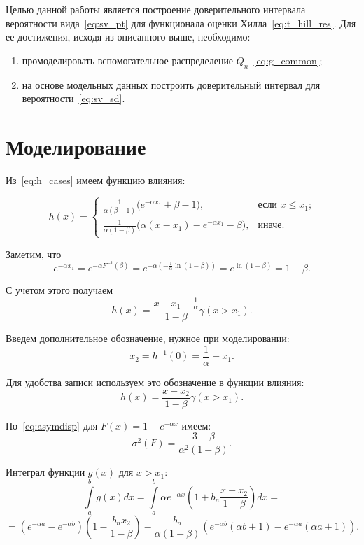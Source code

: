 \documentclass[12pt, specialist, subf, substylefile = spbu.rtx]{disser}
\begin{document}
Целью данной работы является построение доверительного интервала вероятности вида~\eqref{eq:sv_pt} для функционала оценки Хилла~\eqref{eq:t_hill_res}. Для ее достижения, исходя из описанного выше, необходимо:

\begin{enumerate}
\item промоделировать вспомогательное распределение $Q_n$~\eqref{eq:g_common};

\item на основе модельных данных построить доверительный интервал для вероятности~\eqref{eq:sv_sd}.

\end{enumerate}

\section{Моделирование}

Из~\eqref{eq:h_cases} имеем функцию влияния:

\begin{equation*}
h(x)=
\begin{cases}
\frac{1}{\alpha(\beta-1)}\big(e^{-\alpha x_1} +\beta-1\big),
	&\text{если $x \le x_1$;}\\
\frac{1}{\alpha(1-\beta)}\big(\alpha(x-x_1)- e^{-\alpha x_1}-\beta\big),
	&\text{иначе.}
\end{cases}
\end{equation*}

Заметим, что 
$$
e^{-\alpha x_1}=
e^{-\alpha F^{-1}(\beta)}=
e^{-\alpha \left(-\frac{1}{\alpha}\ln(1-\beta)\right)}=
e^{\ln(1-\beta)}=
1-\beta.
$$

С учетом этого получаем
\begin{equation*}
h(x)=\frac{x-x_1-\frac{1}{\alpha}}{1-\beta}\gamma(x>x_1).
\end{equation*}

Введем дополнительное обозначение, нужное при моделировании:
$$
x_2=h^{-1}(0)=\frac{1}{\alpha}+x_1.
$$

Для удобства записи используем это обозначение в функции влияния:
\begin{equation*}
h(x)=\frac{x-x_2}{1-\beta}\gamma(x>x_1).
\end{equation*}

По~\eqref{eq:asymdisp} для $F(x)=1-e^{-\alpha x}$ имеем:
$$
\sigma^2(F)=\frac{3-\beta}{\alpha^2(1-\beta)}.
$$


Интеграл функции $g(x)$ для $x>x_1$:
$$
\int \limits_a^b g(x)dx=
\int \limits_a^b \alpha e^{-\alpha x}(1+b_n\frac{x-x_2}{1-\beta})dx = 
$$
\begin{equation}\label{eq:gint}
=(e^{-\alpha a}-e^{-\alpha b})(1-\frac{b_n x_2}{1-\beta})-
\frac{b_n}{\alpha(1-\beta)}\left(e^{-\alpha b}(\alpha b+1)-e^{-\alpha a}(\alpha a+1)\right).
\end{equation}
\end{document}
